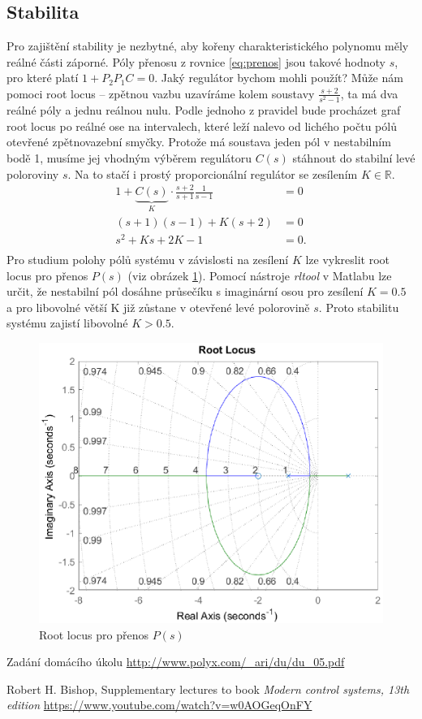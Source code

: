\documentclass[twoside]{article}
\begin{document}
\subsection{Stabilita}
Pro zajištění stability je nezbytné, aby kořeny charakteristického polynomu měly reálné části záporné.
Póly přenosu z rovnice \eqref{eq:prenos} jsou takové hodnoty $s$, pro které platí $1 + P_2 P_1 C = 0$.
Jaký regulátor bychom mohli použít? Může nám pomoci root locus -- zpětnou vazbu uzavíráme kolem
soustavy $\frac{s+2}{s^2 - 1}$, ta má dva reálné póly a jednu reálnou nulu. Podle jednoho z pravidel
bude procházet graf root locus po reálné ose na intervalech, které leží nalevo od lichého počtu pólů otevřené
zpětnovazební smyčky. Protože má soustava jeden pól v nestabilním bodě 1, musíme jej vhodným výběrem regulátoru $C(s)$ stáhnout
do stabilní levé poloroviny $s$. Na to stačí i prostý proporcionální regulátor se zesílením $K \in \mathbb{R}$.
\begin{equation}
	\begin{split}
		1 + \underbrace{C(s)}_{K} \cdot \frac{s+2}{s+1} \frac{1}{s-1} &= 0 \\
		(s+1)(s-1) + K(s+2) &= 0 \\
		s^2 +K s +2K-1 &= 0. \\
	\end{split}
\end{equation}
Pro studium polohy pólů systému v závislosti na zesílení $K$ lze vykreslit root locus pro přenos $P(s)$ (viz obrázek \ref{fig:rl}).
Pomocí nástroje \textit{rltool} v Matlabu lze určit, že nestabilní pól dosáhne průsečíku s imaginární osou
pro zesílení $K = 0.5$ a pro libovolné větší K již zůstane v otevřené levé polorovině $s$. Proto stabilitu systému zajistí libovolné $K > 0.5$.

\begin{figure}
	\centering
	\includegraphics{rl.eps}
	\caption{Root locus pro přenos $P(s)$}
	\label{fig:rl}
\end{figure}

\begin{thebibliography}{9}

	 Zadání domácího úkolu \url{http://www.polyx.com/_ari/du/du_05.pdf}

	Robert H. Bishop, Supplementary lectures to book \emph{Modern control systems, 13th edition} \url{https://www.youtube.com/watch?v=w0AOGeqOnFY}

\end{thebibliography}
\end{document}
